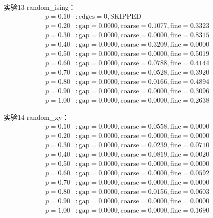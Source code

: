 \documentclass[11pt,a4paper]{book}
\theoremstyle{definition}
\begin{document}
实验13 random\_ising：
\begin{align*}
p=0.10 &: \text{edges}=0, \text{SKIPPED} \\
p=0.20 &: \text{gap}=0.0000, \text{coarse}=0.1077, \text{fine}=0.3323 \\
p=0.30 &: \text{gap}=0.0000, \text{coarse}=0.0000, \text{fine}=0.8315 \\
p=0.40 &: \text{gap}=0.0000, \text{coarse}=0.3209, \text{fine}=0.0000 \\
p=0.50 &: \text{gap}=0.0000, \text{coarse}=0.0000, \text{fine}=0.5019 \\
p=0.60 &: \text{gap}=0.0000, \text{coarse}=0.0788, \text{fine}=0.4144 \\
p=0.70 &: \text{gap}=0.0000, \text{coarse}=0.0528, \text{fine}=0.3920 \\
p=0.80 &: \text{gap}=0.0000, \text{coarse}=0.0166, \text{fine}=0.4894 \\
p=0.90 &: \text{gap}=0.0000, \text{coarse}=0.0000, \text{fine}=0.3096 \\
p=1.00 &: \text{gap}=0.0000, \text{coarse}=0.0000, \text{fine}=0.2638
\end{align*}

实验14 random\_xy：
\begin{align*}
p=0.10 &: \text{gap}=0.0000, \text{coarse}=0.0558, \text{fine}=0.0000 \\
p=0.20 &: \text{gap}=0.0000, \text{coarse}=0.0000, \text{fine}=0.0000 \\
p=0.30 &: \text{gap}=0.0000, \text{coarse}=0.0239, \text{fine}=0.0710 \\
p=0.40 &: \text{gap}=0.0000, \text{coarse}=0.0819, \text{fine}=0.0020 \\
p=0.50 &: \text{gap}=0.0000, \text{coarse}=0.0000, \text{fine}=0.0000 \\
p=0.60 &: \text{gap}=0.0000, \text{coarse}=0.0000, \text{fine}=0.0592 \\
p=0.70 &: \text{gap}=0.0000, \text{coarse}=0.0000, \text{fine}=0.0000 \\
p=0.80 &: \text{gap}=0.0000, \text{coarse}=0.0156, \text{fine}=0.0603 \\
p=0.90 &: \text{gap}=0.0000, \text{coarse}=0.0000, \text{fine}=0.0000 \\
p=1.00 &: \text{gap}=0.0000, \text{coarse}=0.0000, \text{fine}=0.1690
\end{align*}
\end{document}

